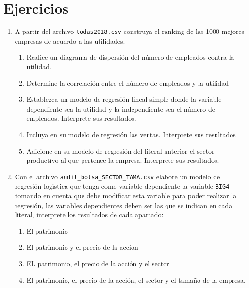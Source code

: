 \documentclass[letterpaper,]{book}
\providecommand{\tightlist}{%
  \setlength{\itemsep}{0pt}\setlength{\parskip}{0pt}}
\begin{document}
\newpage

\hypertarget{ejercicios-2}{%
\section{Ejercicios}\label{ejercicios-2}}

\begin{enumerate}
\def\labelenumi{\arabic{enumi}.}
\item
  A partir del archivo \texttt{todas2018.csv} construya el ranking de las 1000 mejores empresas de acuerdo a las utilidades.

  \begin{enumerate}
  \def\labelenumii{\alph{enumii}.}
  \tightlist
  \item
    Realice un diagrama de dispersión del número de empleados contra la utilidad.
  \item
    Determine la correlación entre el número de empleados y la utilidad
  \item
    Establezca un modelo de regresión lineal simple donde la variable dependiente sea la utilidad y la independiente sea el número de empleados. Interprete sus resultados.
  \item
    Incluya en su modelo de regresión las ventas. Interprete sus resultados
  \item
    Adicione en su modelo de regresión del literal anterior el sector productivo al que pertence la empresa. Interprete sus resultados.
  \end{enumerate}
\item
  Con el archivo \texttt{audit\_bolsa\_SECTOR\_TAMA.csv} elabore un modelo de regresión logìstica que tenga como variable dependiente la variable \texttt{BIG4} tomando en cuenta que debe modificar esta variable para poder realizar la regresión, las variables dependientes deben ser las que se indican en cada literal, interprete los resultados de cada apartado:

  \begin{enumerate}
  \def\labelenumii{\alph{enumii}.}
  \tightlist
  \item
    El patrimonio
  \item
    El patrimonio y el precio de la acción
  \item
    EL patrimonio, el precio de la acción y el sector
  \item
    El patrimonio, el precio de la acción, el sector y el tamaño de la empresa.
  \end{enumerate}
\end{enumerate}


\end{document}
